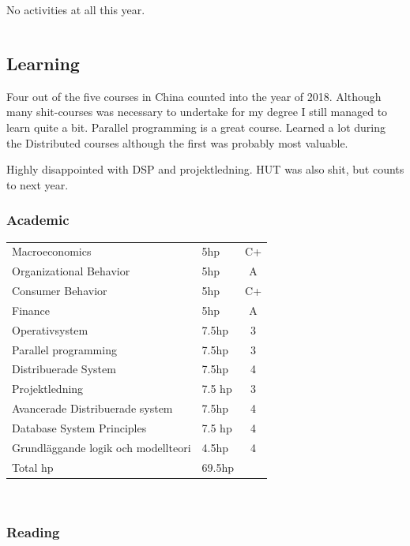\documentclass[a4paper]{article}
\begin{document}
No activities at all this year.

\begin{tabular}{l|c|c|c|c}
	
\end{tabular}

\subsection{Learning}

Four out of the five courses in China counted into the year of 2018.
Although many shit-courses was necessary to undertake for my degree
I still managed to learn quite a bit. Parallel programming is a great
course. Learned a lot during the Distributed courses although the first
was probably most valuable.

Highly disappointed with DSP and projektledning.
HUT was also shit, but counts to next year.

\subsubsection{Academic}
	\begin{tabular}{l|l|c}
		Macroeconomics & 5hp & C+\\
        Organizational Behavior & 5hp & A\\
        Consumer Behavior & 5hp & C+\\
        Finance & 5hp & A \\
        Operativsystem & 7.5hp & 3 \\
        Parallel programming & 7.5hp & 3 \\
        Distribuerade System & 7.5hp & 4 \\
        Projektledning & 7.5 hp & 3 \\
        Avancerade Distribuerade system & 7.5hp & 4 \\
        Database System Principles & 7.5 hp & 4 \\
        Grundläggande logik och modellteori & 4.5hp & 4
        
        \\
        Total hp & 69.5hp  
        \end{tabular} \\ 

\subsubsection{Reading}
\end{document}
